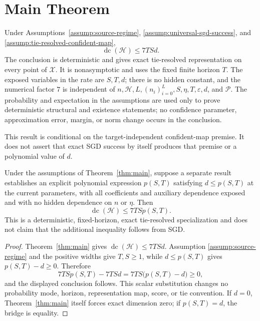 \section{Main Theorem}
\label{sec:main-theorem}

\begin{theorem}
\label{thm:main}
Under Assumptions~\ref{assump:source-regime},
\ref{assump:universal-sgd-success}, and
\ref{assump:tie-resolved-confident-map},
\[
\operatorname{dc}(\mathcal H)\leq 7TSd.
\]
The conclusion is deterministic and gives exact tie-resolved representation on
every point of $\mathcal X$.  It is nonasymptotic and uses the fixed finite
horizon $T$.  The exposed variables in the rate are $S,T,d$; there is no
hidden constant, and the numerical factor $7$ is independent of
$n,\mathcal H,L,(n_i)_{i=0}^L,S,\eta,T,\varepsilon,d$, and $\mathcal P$.
The probability and expectation in the assumptions are used only to prove
deterministic structural and existence statements; no confidence parameter,
approximation error, margin, or norm change occurs in the conclusion.
\end{theorem}

This result is conditional on the target-independent confident-map premise.
It does not assert that exact SGD success by itself produces that premise or a
polynomial value of $d$.

\begin{corollary}
\label{cor:main-polynomial-specialization}
Under the assumptions of Theorem~\ref{thm:main}, suppose a separate result
establishes an explicit polynomial expression $p(S,T)$ satisfying
$d\leq p(S,T)$ at the current parameters, with all coefficients and auxiliary
dependence exposed and with no hidden dependence on $n$ or $\eta$.  Then
\[
\operatorname{dc}(\mathcal H)\leq7TSp(S,T).
\]
This is a deterministic, fixed-horizon, exact tie-resolved specialization and
does not claim that the additional inequality follows from SGD.
\end{corollary}

\begin{proof}
Theorem~\ref{thm:main} gives
$\operatorname{dc}(\mathcal H)\leq7TSd$.  Assumption
\ref{assump:source-regime} and the positive widths give $T,S\geq1$, while
$d\leq p(S,T)$ gives $p(S,T)-d\geq0$.  Therefore
\[
7TSp(S,T)-7TSd=7TS\bigl(p(S,T)-d\bigr)\geq0,
\]
and the displayed conclusion follows.  This scalar substitution changes no
probability mode, horizon, representation map, score, or tie convention.  If
$d=0$, Theorem~\ref{thm:main} itself forces exact dimension zero; if
$p(S,T)=d$, the bridge is equality.
\end{proof}

